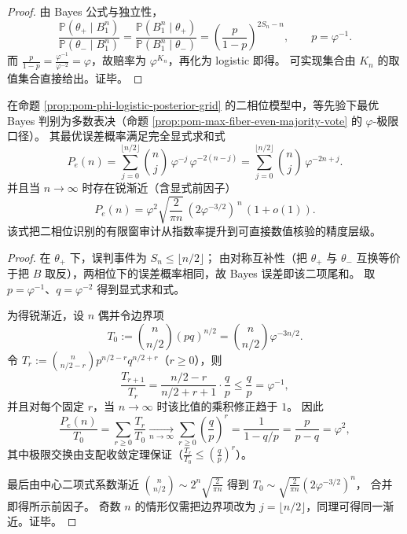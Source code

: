 \begin{proof}
由 Bayes 公式与独立性，
\[
\frac{\mathbb{P}(\theta_+\mid B_1^n)}{\mathbb{P}(\theta_-\mid B_1^n)}
=\frac{\mathbb{P}(B_1^n\mid\theta_+)}{\mathbb{P}(B_1^n\mid\theta_-)}
=\left(\frac{p}{1-p}\right)^{2S_n-n},
\qquad p=\varphi^{-1}.
\]
而 \(\frac{p}{1-p}=\frac{\varphi^{-1}}{\varphi^{-2}}=\varphi\)，故赔率为 \(\varphi^{K_n}\)，再化为 logistic 即得。
可实现集合由 \(K_n\) 的取值集合直接给出。证毕。
\end{proof}

\begin{theorem}[有限样本最优误差的显式公式与锐渐近前因子]\label{thm:pom-bayes-error-explicit-sharp-asymptotic}
在命题 \ref{prop:pom-phi-logistic-posterior-grid} 的二相位模型中，等先验下最优 Bayes 判别为多数表决（命题 \ref{prop:pom-max-fiber-even-majority-vote} 的 \(\varphi\)-极限口径）。
其最优误差概率满足完全显式求和式
\[
\boxed{\;
P_e(n)=\sum_{j=0}^{\lfloor n/2\rfloor}\binom{n}{j}\,\varphi^{-j}\,\varphi^{-2(n-j)}
=\sum_{j=0}^{\lfloor n/2\rfloor}\binom{n}{j}\,\varphi^{-2n+j}.\;}
\]
并且当 \(n\to\infty\) 时存在锐渐近（含显式前因子）
\[
\boxed{\;
P_e(n)=\varphi^{2}\sqrt{\frac{2}{\pi n}}\,(2\varphi^{-3/2})^{\,n}\,(1+o(1)).\;}
\]
该式把二相位识别的有限窗审计从指数率提升到可直接数值核验的精度层级。
\end{theorem}

\begin{proof}
在 \(\theta_+\) 下，误判事件为 \(S_n\le \lfloor n/2\rfloor\)；
由对称互补性（把 \(\theta_+\) 与 \(\theta_-\) 互换等价于把 \(B\) 取反），两相位下的误差概率相同，故 Bayes 误差即该二项尾和。
取 \(p=\varphi^{-1}\)、\(q=\varphi^{-2}\) 得到显式求和式。
\par
为得锐渐近，设 \(n\) 偶并令边界项
\[
T_0:=\binom{n}{n/2}(pq)^{n/2}=\binom{n}{n/2}\varphi^{-3n/2}.
\]
令 \(T_r:=\binom{n}{n/2-r}p^{n/2-r}q^{n/2+r}\)（\(r\ge 0\)），则
\[
\frac{T_{r+1}}{T_r}
=\frac{n/2-r}{n/2+r+1}\cdot\frac{q}{p}
\le \frac{q}{p}=\varphi^{-1},
\]
并且对每个固定 \(r\)，当 \(n\to\infty\) 时该比值的乘积修正趋于 \(1\)。
因此
\[
\frac{P_e(n)}{T_0}
=\sum_{r\ge 0}\frac{T_r}{T_0}
\xrightarrow[n\to\infty]{}
\sum_{r\ge 0}\left(\frac{q}{p}\right)^r
=\frac{1}{1-q/p}
=\frac{p}{p-q}
=\varphi^2,
\]
其中极限交换由支配收敛定理保证（\(\frac{T_r}{T_0}\le (\frac{q}{p})^r\)）。
\par
最后由中心二项式系数渐近
\(
\binom{n}{n/2}\sim 2^n\sqrt{\frac{2}{\pi n}}
\)
得到
\(
T_0\sim \sqrt{\frac{2}{\pi n}}(2\varphi^{-3/2})^{n}
\)，
合并即得所示前因子。
奇数 \(n\) 的情形仅需把边界项改为 \(j=\lfloor n/2\rfloor\)，同理可得同一渐近。证毕。
\end{proof}

